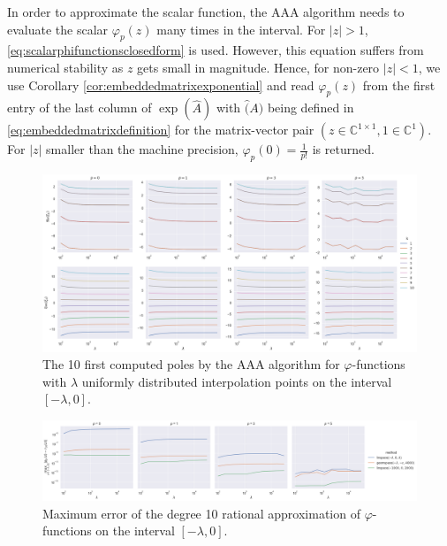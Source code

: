 \begin{remark}
    In order to approximate the scalar function, the AAA algorithm needs to evaluate the scalar
    $\varphi_p(z)$ many times in the interval. For $|z| > 1$, \eqref{eq:scalarphifunctionsclosedform}
    is used.
    However, this equation suffers from numerical stability as $z$ gets small in magnitude. Hence, for
    non-zero $|z| < 1$, we use Corollary \ref{cor:embeddedmatrixexponential} and read $\varphi_p(z)$
    from the first entry of the last column of $\exp(\hat{A})$ with $\hat(A)$ being defined in
    \eqref{eq:embeddedmatrixdefinition} for the matrix-vector pair
    $(z \in \mathbb{C}^{1 \times 1}, 1 \in \mathbb{C}^{1})$. For $|z|$ smaller than the machine precision,
    $\varphi_p(0) = \frac{1}{p!}$ is returned.
\end{remark}

\begin{figure}[h!]
    \centering
    \includegraphics[width=.9\textwidth]{img/AAA/poles_linspace_m10.png}
    \caption{
        The 10 first computed poles by the AAA algorithm for $\varphi$-functions with $\lambda$ uniformly
        distributed interpolation points on the interval $[-\lambda, 0]$.
    }
    \label{fig:polesAAA}
\end{figure}


\begin{figure}[h!]
    \centering
    \includegraphics[width=.9\textwidth]{img/AAA/errors_methods_m10.png}
    \caption{
        Maximum error of the degree 10 rational approximation of $\varphi$-functions on the interval
        $[-\lambda, 0]$.
    }
    \label{fig:errorsAAAmethods}
\end{figure}

